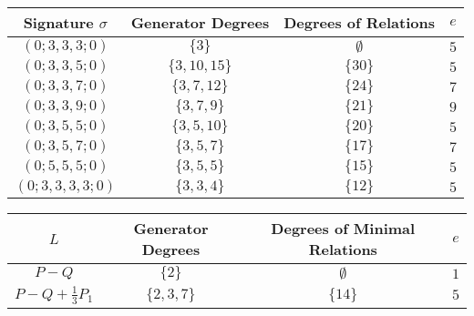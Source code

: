\documentclass[a0,landscape]{a0poster}
\newcommand{\halfcan}{L}
\theoremstyle{definition}
\begin{document}
\begin{multicols}{3}
\begin{minipage}{38cm}
\centering

\begin{tabular}
	{| c || c | c | c |}
	\hline
	Signature $\sigma$ & Generator Degrees & Degrees of Relations & $e$ \\
	\hline
	\hline

	$(0; 3, 3, 3; 0)$ & $\{3\}$ & $\emptyset$ & $5$ \\	\hline

	$(0; 3, 3, 5; 0)$ & $\{3, 10, 15\}$ & $\{30\}$ & $5$ \\	\hline
	
	$(0; 3, 3, 7; 0)$ & $\{3, 7, 12\}$ & $\{24\}$ & $7$ \\	\hline
	
	$(0; 3, 3, 9; 0)$ & $\{3, 7, 9\}$ & $\{21\}$ & $9$ \\	\hline
	
	$(0; 3, 5, 5; 0)$ & $\{3, 5, 10\}$ & $\{20\}$ & $5$ \\	\hline
	
	$(0; 3, 5, 7; 0)$ & $\{3, 5, 7\}$ & $\{17\}$ & $7$ \\	\hline
	
	$(0; 5, 5, 5; 0)$ & $\{3, 5, 5\}$ & $\{15\}$ & $5$ \\	\hline
	
	$(0; 3, 3, 3, 3; 0)$ & $\{3, 3, 4\}$ & $\{12\}$ & $5$ \\	\hline
\end{tabular}


\label{table:g-0-exceptional}
\end{minipage}


\begin{minipage}{38cm}
\centering




\begin{center}
\begin{tabular}
{| c || c | c | c |}
	\hline
	$\halfcan$ & Generator Degrees & Degrees of Minimal Relations & $e$ \\
	\hline
	\hline
	$P - Q$ & $\{2\}$ & $\emptyset$ & $1$\\	\hline

	$P - Q + \frac{1}{3} P_1$ & $\{2, 3, 7\}$ & $\{14\}$ & $5$ \\	\hline


\end{tabular}
\end{center}
\end{minipage}
\end{multicols}
\end{document}
